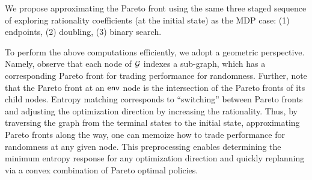 We propose approximating the  Pareto front using the same three staged sequence of exploring 
rationality coefficients (at the initial state) as the MDP case: (1) endpoints, (2) doubling,
(3) binary search.

To perform the above computations efficiently, we adopt a geometric
perspective. Namely, observe that each node of $\mathcal{G}$ indexes a
sub-graph, which has a corresponding Pareto front for trading
performance for randomness. Further, note that the Pareto front at an
$\mathsf{env}$ node is the intersection of the Pareto fronts of its child
nodes. Entropy matching corresponds to ``switching'' between Pareto
fronts and adjusting the optimization direction by increasing the
rationality.  Thus, by traversing the graph from the terminal states
to the initial state, approximating Pareto fronts along the way, one
can memoize how to trade performance for randomness at any given
node. This preprocessing enables determining the minimum entropy
response for any optimization direction and quickly replanning via a
convex combination of Pareto optimal policies.





